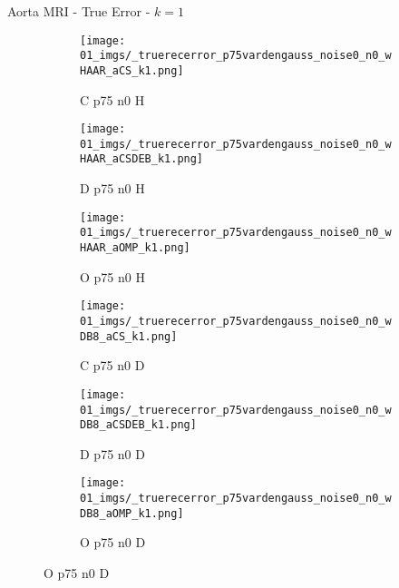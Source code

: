 \begin{frame}{Aorta MRI - True Error - $k=1$}{}
\begin{figure}
\begin{subfigure}{0.13\textwidth}
\texttt{[image: 01\_imgs/\_truerecerror\_p75vardengauss\_noise0\_n0\_wHAAR\_aCS\_k1.png]}
\caption*{\tiny C p75 n0 H}
\end{subfigure}
\begin{subfigure}{0.13\textwidth}
\texttt{[image: 01\_imgs/\_truerecerror\_p75vardengauss\_noise0\_n0\_wHAAR\_aCSDEB\_k1.png]}
\caption*{\tiny D p75 n0 H}
\end{subfigure}
\begin{subfigure}{0.13\textwidth}
\texttt{[image: 01\_imgs/\_truerecerror\_p75vardengauss\_noise0\_n0\_wHAAR\_aOMP\_k1.png]}
\caption*{\tiny O p75 n0 H}
\end{subfigure}
\begin{subfigure}{0.13\textwidth}
\texttt{[image: 01\_imgs/\_truerecerror\_p75vardengauss\_noise0\_n0\_wDB8\_aCS\_k1.png]}
\caption*{\tiny C p75 n0 D}
\end{subfigure}
\begin{subfigure}{0.13\textwidth}
\texttt{[image: 01\_imgs/\_truerecerror\_p75vardengauss\_noise0\_n0\_wDB8\_aCSDEB\_k1.png]}
\caption*{\tiny D p75 n0 D}
\end{subfigure}
\begin{subfigure}{0.13\textwidth}
\texttt{[image: 01\_imgs/\_truerecerror\_p75vardengauss\_noise0\_n0\_wDB8\_aOMP\_k1.png]}
\caption*{\tiny O p75 n0 D}
\end{subfigure}
\end{figure}
\end{frame}


